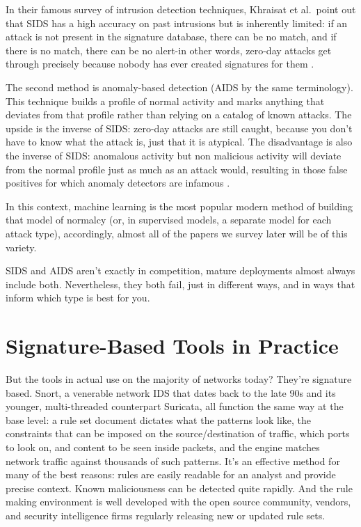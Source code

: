 In their famous survey of intrusion detection techniques, Khraisat et al.\ point out that SIDS has a high accuracy on past intrusions but is inherently limited: if an attack is not present in the signature database, there can be no match, and if there is no match, there can be no alert-in other words, zero-day attacks get through precisely because nobody has ever created signatures for them \cite{khraisat2019survey}. 

The second method is anomaly-based detection (AIDS by the same terminology). This technique builds a profile of normal activity and marks anything that deviates from that profile rather than relying on a catalog of known attacks. The upside is the inverse of SIDS: zero-day attacks are still caught, because you don’t have to know what the attack is, just that it is atypical. The disadvantage is also the inverse of SIDS: anomalous activity but non malicious activity will deviate from the normal profile just as much as an attack would, resulting in those false positives for which anomaly detectors are infamous \cite{khraisat2019survey}. 

In this context, machine learning is the most popular modern method of building that model of normalcy (or, in supervised models, a separate model for each attack type), accordingly, almost all of the papers we survey later will be of this variety. 

SIDS and AIDS aren’t exactly in competition, mature deployments almost always include both. Nevertheless, they both fail, just in different ways, and in ways that inform which type is best for you.

\section{Signature-Based Tools in Practice}
\label{sec:ids_signature}

But the tools in actual use on the majority of networks today? They’re signature based. Snort, a venerable network IDS that dates back to the late 90s and its younger, multi-threaded counterpart Suricata, all function the same way at the base level: a rule set document dictates what the patterns look like, the constraints that can be imposed on the source/destination of traffic, which ports to look on, and content to be seen inside packets, and the engine matches network traffic against thousands of such patterns. 
It’s an effective method for many of the best reasons: rules are easily readable for an analyst and provide precise context. 
Known maliciousness can be detected quite rapidly. And the rule making environment is well developed with the open source community, vendors, and security intelligence firms regularly releasing new or updated rule sets.


